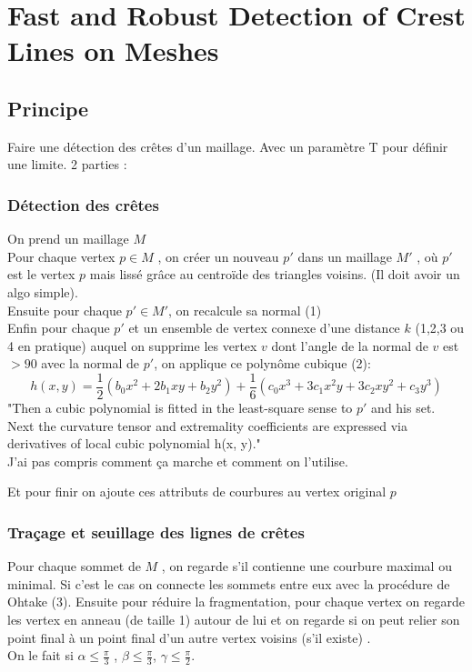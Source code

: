 \documentclass[a4paper]{article}
\begin{document}
\section{Fast and Robust Detection of Crest Lines on Meshes}
\subsection{Principe}
Faire une détection des crêtes d'un maillage. Avec un paramètre T pour définir une limite.  
2 parties : \\
\subsubsection{Détection des crêtes}
On prend un maillage $M$\\
Pour chaque vertex $p \in M$ , on créer un nouveau $p'$ dans un maillage $M'$ , où $p'$ est le vertex $p$ mais lissé grâce au centroïde des triangles voisins. (Il doit avoir un algo simple).\\
Ensuite pour chaque $p' \in M'$, on recalcule sa normal (1) \\

Enfin pour chaque $p'$ et un ensemble de vertex connexe d'une distance $k$ (1,2,3 ou 4 en pratique) auquel on supprime les vertex $v$ dont l'angle de la normal de $v$ est $> 90$ avec la normal de $p'$, on applique ce polynôme cubique (2): 
\[h(x,y) = \frac{1}{2} (b_0x^2+2b_1xy+b_2y^2) + \frac{1}{6} (c_0x^3 + 3c_1x^2y+3c_2xy^2 + c_3y^3) \] 
"Then a cubic polynomial is fitted in the least-square sense to $p'$ and his set. Next the curvature tensor and extremality coefficients are expressed via derivatives of local cubic polynomial h(x, y)." \\
J'ai pas compris comment ça marche et comment on l'utilise. 

Et pour finir on ajoute ces attributs de courbures au vertex original $p$

\subsubsection{Traçage et seuillage des lignes de crêtes}
Pour chaque sommet de $M$ , on regarde s'il contienne une courbure maximal ou minimal. Si c'est le cas on connecte les sommets entre eux avec la procédure de Ohtake (3). 
Ensuite pour réduire la fragmentation, pour chaque vertex on regarde les vertex en anneau (de taille 1) autour de lui et on regarde si on peut relier son point final à un point final d'un autre vertex voisins (s'il existe) . \\
On le fait si $\alpha \leq \frac{\pi}{3}$ , $\beta \leq \frac{\pi}{3}$,  $\gamma \leq \frac{\pi}{2}$.
\end{document}
